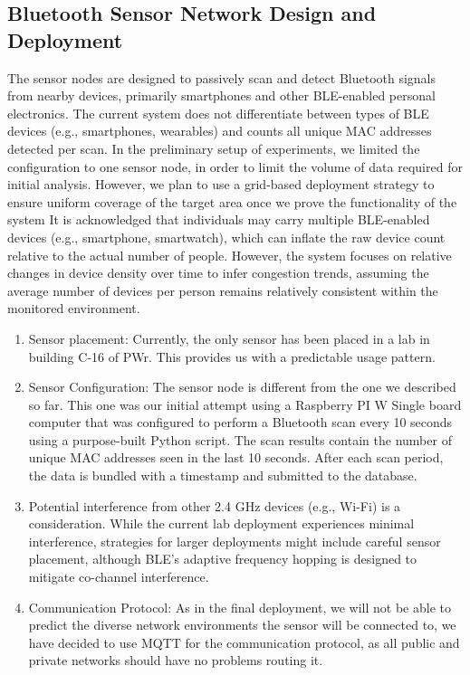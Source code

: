 \documentclass[runningheads]{llncs}
\begin{document}
\subsection{Bluetooth Sensor Network Design and Deployment}

The sensor nodes are designed to passively scan and detect Bluetooth signals from nearby devices, primarily smartphones and other BLE-enabled personal electronics.
The current system does not differentiate between types of BLE devices (e.g., smartphones, wearables) and counts all unique MAC addresses detected per scan.
In the preliminary setup of experiments, we limited the configuration to one sensor node, in order to limit the volume  of data required for initial analysis. However, we plan to use a grid-based deployment
strategy to ensure uniform coverage of the target area once we prove the functionality of the system
It is acknowledged that individuals may carry multiple BLE-enabled devices (e.g., smartphone, smartwatch), which can inflate the raw device count relative to the actual number of people. However, the system focuses on relative changes in device density over time to infer congestion trends, assuming the average number of devices per person remains relatively consistent within the monitored environment.
\begin{enumerate}
    \item Sensor placement: Currently, the only sensor has been placed in a lab in building C-16 of PWr. This provides us with a predictable usage pattern.
    \item Sensor Configuration: The sensor node is different from the one we described so far. This one was our initial attempt using a Raspberry PI W Single board computer that  was configured to perform a Bluetooth scan every 10 seconds using a purpose-built Python script. The scan results contain the number of unique MAC addresses seen in the last 10 seconds. After each scan period, the data is bundled with a timestamp and submitted to the database.
    \item Potential interference from other 2.4 GHz devices (e.g., Wi-Fi) is a consideration. While the current lab deployment experiences minimal interference, strategies for larger deployments might include careful sensor placement, although BLE's adaptive frequency hopping is designed to mitigate co-channel interference.
    \item Communication Protocol: As in the final deployment, we will not be able to predict the diverse network environments the sensor will be connected to, we have decided to use MQTT for the communication protocol, as all public and private networks should have no problems routing it.
\end{enumerate}
\end{document}
